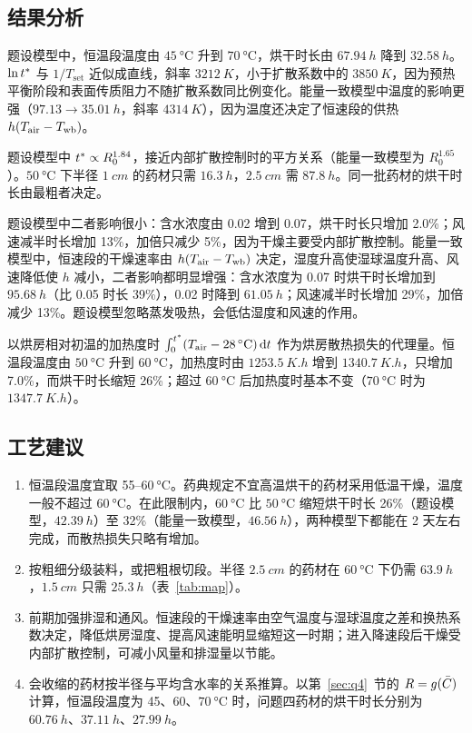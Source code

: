 \subsection{结果分析}

 题设模型中，恒温段温度由 $\SI{45}{\celsius}$ 升到 $\SI{70}{\celsius}$，烘干时长由 $\SI{67.94}{h}$ 降到 $\SI{32.58}{h}$。$\ln t^{*}$ 与 $1/T_{\mathrm{set}}$ 近似成直线，斜率 $\SI{3212}{K}$，小于扩散系数中的 $\SI{3850}{K}$，因为预热平衡阶段和表面传质阻力不随扩散系数同比例变化。能量一致模型中温度的影响更强（$97.13\to\SI{35.01}{h}$，斜率 $\SI{4314}{K}$），因为温度还决定了恒速段的供热 $h(T_{\mathrm{air}}-T_{\mathrm{wb}})$。

 题设模型中 $t^{*}\propto R_0^{1.84}$，接近内部扩散控制时的平方关系（能量一致模型为 $R_0^{1.65}$）。$\SI{50}{\celsius}$ 下半径 $\SI{1}{cm}$ 的药材只需 $\SI{16.3}{h}$，$\SI{2.5}{cm}$ 需 $\SI{87.8}{h}$。同一批药材的烘干时长由最粗者决定。

 题设模型中二者影响很小：含水浓度由 0.02 增到 0.07，烘干时长只增加 2.0\%；风速减半时长增加 13\%，加倍只减少 5\%，因为干燥主要受内部扩散控制。能量一致模型中，恒速段的干燥速率由 $h(T_{\mathrm{air}}-T_{\mathrm{wb}})$ 决定，湿度升高使湿球温度升高、风速降低使 $h$ 减小，二者影响都明显增强：含水浓度为 0.07 时烘干时长增加到 $\SI{95.68}{h}$（比 0.05 时长 39\%），0.02 时降到 $\SI{61.05}{h}$；风速减半时长增加 29\%，加倍减少 13\%。题设模型忽略蒸发吸热，会低估湿度和风速的作用。

 以烘房相对初温的加热度时 $\int_0^{t^{*}}(T_{\mathrm{air}}-\SI{28}{\celsius})\,\mathrm{d}t$ 作为烘房散热损失的代理量。恒温段温度由 $\SI{50}{\celsius}$ 升到 $\SI{60}{\celsius}$，加热度时由 $\SI{1253.5}{K.h}$ 增到 $\SI{1340.7}{K.h}$，只增加 7.0\%，而烘干时长缩短 26\%；超过 $\SI{60}{\celsius}$ 后加热度时基本不变（$\SI{70}{\celsius}$ 时为 $\SI{1347.7}{K.h}$）。

\subsection{工艺建议}

\begin{enumerate}[label=(\arabic*),leftmargin=2.2em,itemsep=1pt]
\item 恒温段温度宜取 55--$\SI{60}{\celsius}$。药典规定不宜高温烘干的药材采用低温干燥，温度一般不超过 $\SI{60}{\celsius}$\cite{chp}。在此限制内，$\SI{60}{\celsius}$ 比 $\SI{50}{\celsius}$ 缩短烘干时长 26\%（题设模型，$\SI{42.39}{h}$）至 32\%（能量一致模型，$\SI{46.56}{h}$），两种模型下都能在 2 天左右完成，而散热损失只略有增加。
\item 按粗细分级装料，或把粗根切段。半径 $\SI{2.5}{cm}$ 的药材在 $\SI{60}{\celsius}$ 下仍需 $\SI{63.9}{h}$，$\SI{1.5}{cm}$ 只需 $\SI{25.3}{h}$（表~\ref{tab:map}）。
\item 前期加强排湿和通风。恒速段的干燥速率由空气温度与湿球温度之差和换热系数决定，降低烘房湿度、提高风速能明显缩短这一时期；进入降速段后干燥受内部扩散控制，可减小风量和排湿量以节能。
\item 会收缩的药材按半径与平均含水率的关系推算。以第~\ref{sec:q4}~节的 $R=g(\bar{C})$ 计算，恒温段温度为 45、60、$\SI{70}{\celsius}$ 时，问题四药材的烘干时长分别为 $\SI{60.76}{h}$、$\SI{37.11}{h}$、$\SI{27.99}{h}$。
\end{enumerate}
